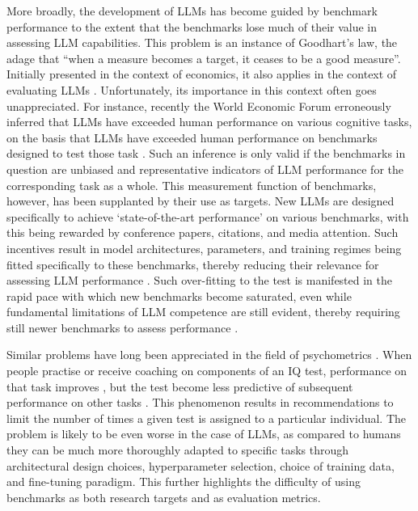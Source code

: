 \documentclass{article}
\begin{document}
More broadly, the development of LLMs has become guided by benchmark performance to the extent that the benchmarks lose much of their value in assessing LLM capabilities. This problem is an instance of Goodhart's law, the adage that “when a measure becomes a target, it ceases to be a good measure”. Initially presented in the context of economics, it also applies in the context of evaluating LLMs \citep{banerjee2024vulnerability, thomas2022reliance}. Unfortunately, its importance in this context often goes unappreciated. For instance, recently the World Economic Forum erroneously inferred that LLMs have exceeded human performance on various cognitive tasks, on the basis that LLMs have exceeded human performance on benchmarks designed to test those task \citep{WEF2024}. Such an inference is only valid if the benchmarks in question are unbiased and representative indicators of LLM performance for the corresponding task as a whole. This measurement function of benchmarks, however, has been supplanted by their use as targets. New LLMs are designed specifically to achieve ‘state-of-the-art performance’ on various benchmarks, with this being rewarded by conference papers, citations, and media attention. Such incentives result in model architectures, parameters, and training regimes being fitted specifically to these benchmarks, thereby reducing their relevance for assessing LLM performance \citep{alzahrani2024benchmarks}. Such over-fitting to the test is manifested in the rapid pace with which new benchmarks become saturated, even while fundamental limitations of LLM competence are still evident, thereby requiring still newer benchmarks to assess performance \citep{reuel2024betterbench, banerjee2024vulnerability}.

Similar problems have long been appreciated in the field of psychometrics \citep{devon2007psychometric}. When people practise or receive coaching on components of an IQ test, performance on that task improves \citep{bartels2010practice}, but the test become less predictive of subsequent performance on other tasks \citep{te2001practice}. This phenomenon results in recommendations to limit the number of times a given test is assigned to a particular individual. The problem is likely to be even worse in the case of LLMs, as compared to humans they can be much more thoroughly adapted to specific tasks through architectural design choices, hyperparameter selection, choice of training data, and fine-tuning paradigm. This further highlights the difficulty of using benchmarks as both research targets and as evaluation metrics.
\end{document}
